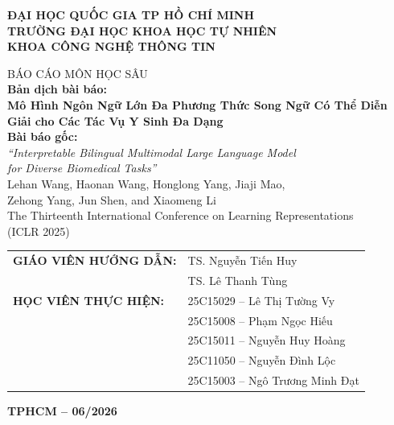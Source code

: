 \documentclass[12pt,a4paper,oneside]{extarticle}
\begin{document}
\begin{titlepage}
\begin{center}

{\large\bfseries ĐẠI HỌC QUỐC GIA TP HỒ CHÍ MINH}\\[2pt]
{\large\bfseries TRƯỜNG ĐẠI HỌC KHOA HỌC TỰ NHIÊN}\\[2pt]
{\large\bfseries KHOA CÔNG NGHỆ THÔNG TIN}\\[0.5cm]

\vspace{0.5cm}

{\large BÁO CÁO MÔN HỌC SÂU}\\[6pt]

{\large\bfseries Bản dịch bài báo:}\\[8pt]
{\LARGE\bfseries Mô Hình Ngôn Ngữ Lớn Đa Phương Thức Song Ngữ Có Thể Diễn Giải cho Các Tác Vụ Y Sinh Đa Dạng}\\[1.2cm]
{\large\bfseries Bài báo gốc:}\\[2pt]
{\large\itshape ``Interpretable Bilingual Multimodal Large Language Model\\
for Diverse Biomedical Tasks''}\\[2pt]
{\large Lehan Wang, Haonan Wang, Honglong Yang, Jiaji Mao,\\
Zehong Yang, Jun Shen, and Xiaomeng Li}\\[2pt]
{\normalsize The Thirteenth International Conference on Learning Representations\\
(ICLR 2025)}\\[1cm]

\begin{flushleft}
\hspace{2cm}\begin{tabular}{ll}
\textbf{GIÁO VIÊN HƯỚNG DẪN:}   & TS. Nguyễn Tiến Huy \\
                                & TS. Lê Thanh Tùng\\[8pt]

\textbf{HỌC VIÊN THỰC HIỆN:}  & 25C15029 -- Lê Thị Tường Vy\\
                              & 25C15008 -- Phạm Ngọc Hiếu\\
                              & 25C15011 -- Nguyễn Huy Hoàng\\
                              & 25C11050 -- Nguyễn Đình Lộc\\
                              & 25C15003 -- Ngô Trương Minh Đạt\\
\end{tabular}
\end{flushleft}

\vfill
{\bfseries TPHCM -- 06/2026}

\end{center}
\end{titlepage}
\end{document}
